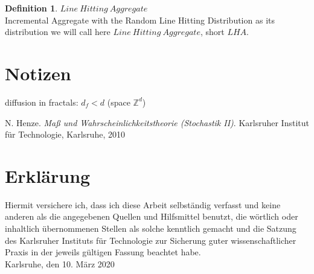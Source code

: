 \documentclass[12pt,a4paper]{scrartcl}
\numberwithin{equation}{section}
\numberwithin{equation}{section}%
\theoremstyle{definition}
\newtheorem{definition}[theorem]{Definition}
\theoremstyle{definition}
\begin{document}
\begin{definition} $\mathit{Line\ Hitting\ Aggregate}$\\
	Incremental Aggregate with the Random Line Hitting Distribution as its distribution we will call here $\mathit{Line\ Hitting\ Aggregate}$, short $\mathit{LHA}$. 
\end{definition}



\newpage


\section{Notizen}

diffusion in fractals: $d_f < d$ (space $\mathbb{Z}^d$)


\newpage

\begin{thebibliography}{Lam00}
\thispagestyle{empty}

N. Henze.
\emph{Maß und Wahrscheinlichkeitstheorie (Stochastik II)}.
Karlsruher Institut für Technologie, Karlsruhe, 2010

\end{thebibliography}

\newpage
  
\thispagestyle{empty}

\vspace*{8cm}


\section*{Erklärung}

Hiermit versichere ich, dass ich diese Arbeit selbständig verfasst und keine anderen als die angegebenen Quellen und Hilfsmittel benutzt, die wörtlich oder inhaltlich übernommenen Stellen als solche kenntlich gemacht und die Satzung des Karlsruher Instituts für Technologie zur Sicherung guter wissenschaftlicher Praxis in der jeweils gültigen Fassung beachtet habe. \\[2ex] 

\noindent
Karlsruhe, den 10. März 2020\\[5ex] 
\end{document}
